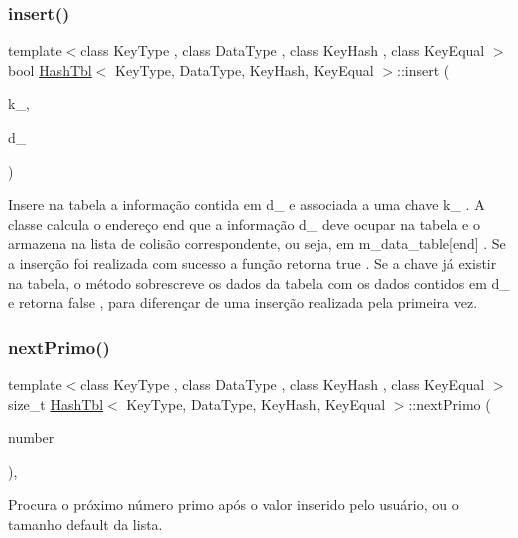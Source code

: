 \subsubsection{\texorpdfstring{insert()}{insert()}}
{\footnotesize\ttfamily template$<$class Key\+Type , class Data\+Type , class Key\+Hash , class Key\+Equal $>$ \\
bool \hyperlink{classHashTbl}{Hash\+Tbl}$<$ Key\+Type, Data\+Type, Key\+Hash, Key\+Equal $>$\+::insert (\begin{DoxyParamCaption}\item[{const Key\+Type \&}]{k\+\_\+,  }\item[{const Data\+Type \&}]{d\+\_\+ }\end{DoxyParamCaption})\hspace{0.3cm}{\ttfamily [inline]}}

Insere na tabela a informação contida em d\+\_\+ e associada a uma chave k\+\_\+ . A classe calcula o endereço end que a informação d\+\_\+ deve ocupar na tabela e o armazena na lista de colisão correspondente, ou seja, em m\+\_\+data\+\_\+table\mbox{[}end\mbox{]} . Se a inserção foi realizada com sucesso a função retorna true . Se a chave já existir na tabela, o método sobrescreve os dados da tabela com os dados contidos em d\+\_\+ e retorna false , para diferençar de uma inserção realizada pela primeira vez. \mbox{\label{classHashTbl_aa85eb1e9ae9c838111b71a6ca464e9a5}} 
\subsubsection{\texorpdfstring{next\+Primo()}{nextPrimo()}}
{\footnotesize\ttfamily template$<$class Key\+Type , class Data\+Type , class Key\+Hash , class Key\+Equal $>$ \\
size\+\_\+t \hyperlink{classHashTbl}{Hash\+Tbl}$<$ Key\+Type, Data\+Type, Key\+Hash, Key\+Equal $>$\+::next\+Primo (\begin{DoxyParamCaption}\item[{size\+\_\+t}]{number }\end{DoxyParamCaption})\hspace{0.3cm}{\ttfamily [inline]}, {\ttfamily [private]}}



Procura o próximo número primo após o valor inserido pelo usuário, ou o tamanho default da lista. 

